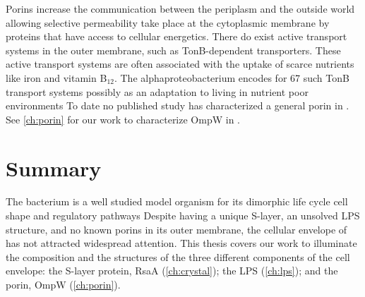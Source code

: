 Porins increase the communication between the periplasm and the outside world allowing selective permeability take place at the cytoplasmic membrane by proteins that have access to
cellular energetics. There do exist active transport systems in the outer membrane, such as TonB-dependent transporters. These active transport systems are often associated with
the uptake of scarce nutrients like iron and vitamin B$_{12}$. The alphaproteobacterium \caulobacter{} encodes for 67 such TonB transport systems
possibly as an adaptation to living in nutrient poor environments To date no published study has characterized a general porin in \caulobacter{}. See
\cref{ch:porin} for our work to characterize OmpW in \caulobacter{}.

 \section{Summary}\label{sec:summary} The bacterium \caulobacter is a well studied model organism for its dimorphic life cycle cell
shape and regulatory pathways Despite having a unique \ac{S-layer}, an unsolved \ac{LPS} structure, and no known porins in
its outer membrane, the cellular envelope of \caulobacter has not attracted
widespread attention. This thesis covers our work to illuminate the composition and the structures of the
three different components of the \caulobacter cell envelope: the \ac{S-layer} protein, RsaA (\cref{ch:crystal}); the \ac{LPS} (\cref{ch:lps}); and the porin, OmpW
(\cref{ch:porin}).


